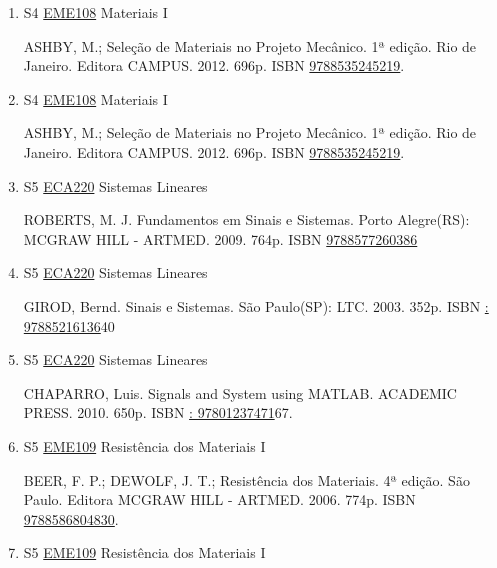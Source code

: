 \documentclass[12pt,a4paper]{book}
\begin{document}
\begin{enumerate}
 
 \item S4 \hyperref[PUD:EME108]{EME108} Materiais I

 ASHBY, M.;  Seleção de Materiais no Projeto Mecânico.  1ª edição.  Rio de Janeiro.  Editora CAMPUS.  2012.  696p.  ISBN \href{http://www.bn.br/site/pages/servicosProfissionais/agenciaISBN/isbnBusca/FbnBuscaISBNCatalogo.asp?pField=ISBN&pIntPagina=1&pISBN=35245219&nidbISBN=true&hidbISBN=true}{9788535245219}.
 \item S4 \hyperref[PUD:EME108]{EME108} Materiais I

 ASHBY, M.;  Seleção de Materiais no Projeto Mecânico.  1ª edição.  Rio de Janeiro.  Editora CAMPUS.  2012.  696p.  ISBN \href{http://www.bn.br/site/pages/servicosProfissionais/agenciaISBN/isbnBusca/FbnBuscaISBNCatalogo.asp?pField=ISBN&pIntPagina=1&pISBN=35245219&nidbISBN=true&hidbISBN=true}{9788535245219}.
 \item S5 \hyperref[PUD:ECA220]{ECA220} Sistemas Lineares

 ROBERTS, M.  J.  Fundamentos em Sinais e Sistemas.  Porto Alegre(RS): MCGRAW HILL - ARTMED.  2009.  764p.  ISBN \href{http://www.bn.br/site/pages/servicosProfissionais/agenciaISBN/isbnBusca/FbnBuscaISBNCatalogo.asp?pField=ISBN&pIntPagina=1&pISBN=77260386&nidbISBN=true&hidbISBN=true}{9788577260386}
 
 
 \item S5 \hyperref[PUD:ECA220]{ECA220} Sistemas Lineares

 GIROD, Bernd.  Sinais e Sistemas.  São Paulo(SP): LTC.  2003.  352p.  ISBN \href{http://www.google.com/search?hl=pt-BR&tbo=p&tbm=bks&q=isbn:: 97885216136&num=10}{: 97885216136}40
 
 
 \item S5 \hyperref[PUD:ECA220]{ECA220} Sistemas Lineares

 CHAPARRO, Luis.  Signals and System using MATLAB.  ACADEMIC PRESS.  2010.  650p.  ISBN \href{http://www.google.com/search?hl=pt-BR&tbo=p&tbm=bks&q=isbn:: 97801237471&num=10}{: 97801237471}67.
 \item S5 \hyperref[PUD:EME109]{EME109} Resistência dos Materiais I

 BEER, F.  P.;  DEWOLF, J.  T.;  Resistência dos Materiais.  4ª edição.  São Paulo.  Editora  MCGRAW HILL - ARTMED.  2006.  774p.  ISBN \href{http://www.bn.br/site/pages/servicosProfissionais/agenciaISBN/isbnBusca/FbnBuscaISBNCatalogo.asp?pField=ISBN&pIntPagina=1&pISBN=86804830&nidbISBN=true&hidbISBN=true}{9788586804830}.  
 
 
 \item S5 \hyperref[PUD:EME109]{EME109} Resistência dos Materiais I


\end{enumerate}
\end{document}

